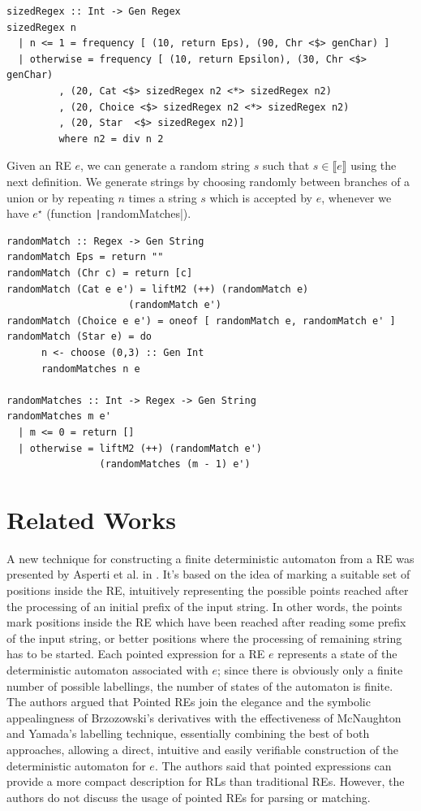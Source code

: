 \documentclass[oneside,12pt]{scrbook}
\newcommand{\haskell}[1]{\texttt|#1|}
\theoremstyle{definition}
\newcommand{\sembrackets}[1]{\ensuremath{\llbracket #1 \rrbracket}}
\theoremstyle{plain}
\theoremstyle{definition}
\begin{document}
\begin{verbatim}
sizedRegex :: Int -> Gen Regex
sizedRegex n
  | n <= 1 = frequency [ (10, return Eps), (90, Chr <$> genChar) ]
  | otherwise = frequency [ (10, return Epsilon), (30, Chr <$> genChar)
         , (20, Cat <$> sizedRegex n2 <*> sizedRegex n2)
         , (20, Choice <$> sizedRegex n2 <*> sizedRegex n2)
         , (20, Star  <$> sizedRegex n2)]
         where n2 = div n 2
\end{verbatim}


Given an RE $e$, we can generate a random string $s$ such that $s \in\sembrackets{e}$
using the next definition. We generate strings by choosing randomly between branches of
a union or by repeating $n$ times a string $s$ which is accepted by $e$, whenever we
have $e^\star$ (function \haskell{randomMatches}).

\begin{verbatim}
randomMatch :: Regex -> Gen String
randomMatch Eps = return ""
randomMatch (Chr c) = return [c]
randomMatch (Cat e e') = liftM2 (++) (randomMatch e)
				     (randomMatch e')
randomMatch (Choice e e') = oneof [ randomMatch e, randomMatch e' ]
randomMatch (Star e) = do
      n <- choose (0,3) :: Gen Int
      randomMatches n e

randomMatches :: Int -> Regex -> Gen String
randomMatches m e'
  | m <= 0 = return []
  | otherwise = liftM2 (++) (randomMatch e')
			    (randomMatches (m - 1) e')
\end{verbatim}

\chapter{Related Works}\label{chapter:relatedworks}

A new technique for constructing a finite deterministic automaton from a RE was presented by Asperti et al. in \cite{Asperti10}. It's based on the idea of marking a suitable set of positions inside the RE, intuitively representing the possible points reached after the processing of an initial prefix of the input string. In other words, the points mark positions inside the RE which have been reached after reading some prefix of the input string, or better positions where the processing of remaining string has to be started. Each pointed expression for a RE $e$ represents a state of the deterministic automaton associated with $e$; since there is obviously only a finite number of possible labellings, the number of states of the automaton is finite. The authors argued that Pointed REs join the elegance and the symbolic appealingness of Brzozowski's derivatives with the effectiveness of McNaughton and Yamada's labelling technique, essentially combining the best of both approaches, allowing a direct, intuitive and easily verifiable construction of the deterministic automaton for $e$. The authors said that pointed expressions can provide a more compact description for RLs than traditional REs. However, the authors do not discuss the usage of pointed REs for parsing or matching. %
\end{document}
